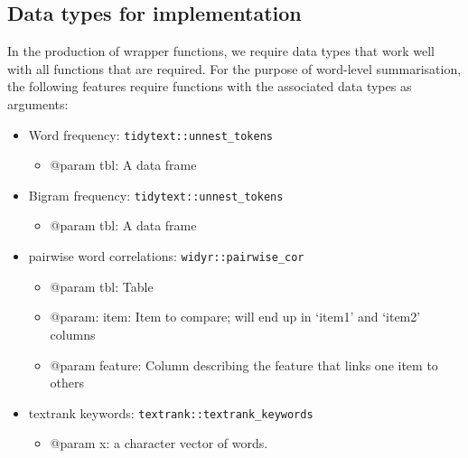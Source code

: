 \documentclass[11pt]{article}
\begin{document}
\subsection{Data types for implementation}
\label{sec:orgfce9ca0}
In the production of wrapper functions, we require data types that
work well with all functions that are required. For the purpose of
word-level summarisation, the following features require functions with the
associated data types as arguments:
\begin{itemize}
\item Word frequency: \texttt{tidytext::unnest\_tokens}
\begin{itemize}
\item @param tbl: A data frame
\end{itemize}
\item Bigram frequency: \texttt{tidytext::unnest\_tokens}
\begin{itemize}
\item @param tbl: A data frame
\end{itemize}
\item pairwise word correlations: \texttt{widyr::pairwise\_cor}
\begin{itemize}
\item @param tbl: Table
\item @param: item: Item to compare; will end up in ‘item1’ and ‘item2’
columns
\item @param feature: Column describing the feature that links one item
to others
\end{itemize}
\item textrank keywords: \texttt{textrank::textrank\_keywords}
\begin{itemize}
\item @param x: a character vector of words.
\end{itemize}
\end{itemize}
\end{document}
